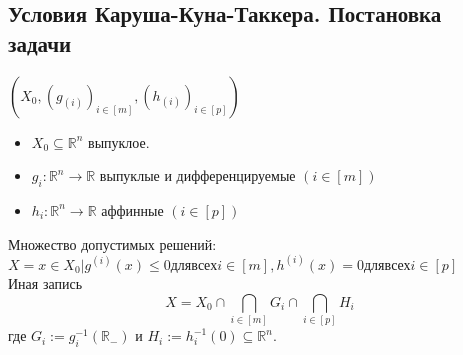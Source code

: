 \subsection{Условия Каруша-Куна-Таккера. Постановка задачи}
$(X_{0},(g_{(i)})_{i\in[m]},(h_{(i)})_{i\in[p]})$\\
\begin{itemize}
    \item $X_{0}\subseteq\mathbb{R}^n$ выпуклое.
\end{itemize}
\begin{itemize}
    \item $g_{i}:\mathbb{R}^n\rightarrow\mathbb{R}$ выпуклые и дифференцируемые $(i\in[m])$
\end{itemize}
\begin{itemize}
    \item $h_{i}:\mathbb{R}^n\rightarrow\mathbb{R}$ аффинные $(i\in[p])$\\
\end{itemize}
Множество допустимых решений:\\
$X = {x \in X_{0} | g^{(i)}(x) \leq 0 для всех i\in[m], h^{(i)}(x) = 0 для всех i\in[p]}$\\
Иная запись
\begin{equation*}
X = X_{0}\cap\bigcap_{i\in[m]}G_{i}\cap\bigcap_{i\in[p]}H_{i}
\end{equation*}
где $G_{i}:=g_{i}^{-1}(\mathbb{R}_{-})$ и $H_{i}:=h_{i}^{-1}({0})\subseteq\mathbb{R}^n$.

